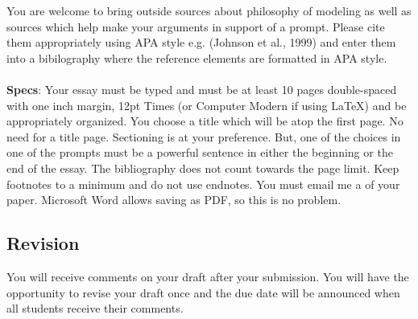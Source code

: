 \documentclass[12pt]{article}
\begin{document}
You are welcome to bring outside sources about philosophy of modeling as well as sources which help make your arguments in support of a prompt. Please cite them appropriately using APA style e.g. (Johnson et al., 1999) and enter them into a bibilography where the reference elements are formatted in APA style.\\
~\\
\textbf{Specs}: Your essay must be typed and must be at least 10 pages double-spaced with one inch margin, 12pt Times (or Computer Modern if using \LaTeX) and be appropriately organized. You choose a title which will be atop the first page. No need for a title page. Sectioning is at your preference. But, one of the choices in one of the prompts must be a powerful sentence in either the beginning or the end of the essay. The bibliography does not count towards the page limit. Keep footnotes to a minimum and do not use endnotes. You must email me a   of your paper. Microsoft Word allows saving as PDF, so this is no problem.

\subsection*{Revision}

You will receive comments on your draft after your submission. You will have the opportunity to revise your draft once and the due date will be announced when all students receive their comments.
\end{document}
